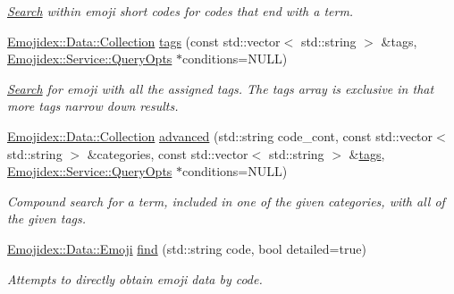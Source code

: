 \begin{DoxyCompactItemize}
\begin{DoxyCompactList}\small\item\em \hyperlink{classEmojidex_1_1Service_1_1Search}{Search} within emoji short codes for codes that end with a term. \end{DoxyCompactList}\item 
\hyperlink{classEmojidex_1_1Data_1_1Collection}{Emojidex\+::\+Data\+::\+Collection} \hyperlink{classEmojidex_1_1Service_1_1Search_af8d1aaece57cd92bf8712493055f2ef6}{tags} (const std\+::vector$<$ std\+::string $>$ \&tags, \hyperlink{classEmojidex_1_1Service_1_1QueryOpts}{Emojidex\+::\+Service\+::\+Query\+Opts} $\ast$conditions=N\+U\+LL)\hypertarget{classEmojidex_1_1Service_1_1Search_af8d1aaece57cd92bf8712493055f2ef6}{}\label{classEmojidex_1_1Service_1_1Search_af8d1aaece57cd92bf8712493055f2ef6}

\begin{DoxyCompactList}\small\item\em \hyperlink{classEmojidex_1_1Service_1_1Search}{Search} for emoji with all the assigned tags. The tags array is exclusive in that more tags narrow down results. \end{DoxyCompactList}\item 
\hyperlink{classEmojidex_1_1Data_1_1Collection}{Emojidex\+::\+Data\+::\+Collection} \hyperlink{classEmojidex_1_1Service_1_1Search_a2924585a8bb92c1b902477cabc154fb0}{advanced} (std\+::string code\+\_\+cont, const std\+::vector$<$ std\+::string $>$ \&categories, const std\+::vector$<$ std\+::string $>$ \&\hyperlink{classEmojidex_1_1Service_1_1Search_af8d1aaece57cd92bf8712493055f2ef6}{tags}, \hyperlink{classEmojidex_1_1Service_1_1QueryOpts}{Emojidex\+::\+Service\+::\+Query\+Opts} $\ast$conditions=N\+U\+LL)\hypertarget{classEmojidex_1_1Service_1_1Search_a2924585a8bb92c1b902477cabc154fb0}{}\label{classEmojidex_1_1Service_1_1Search_a2924585a8bb92c1b902477cabc154fb0}

\begin{DoxyCompactList}\small\item\em Compound search for a term, included in one of the given categories, with all of the given tags. \end{DoxyCompactList}\item 
\hyperlink{classEmojidex_1_1Data_1_1Emoji}{Emojidex\+::\+Data\+::\+Emoji} \hyperlink{classEmojidex_1_1Service_1_1Search_a80970b4a18e5bcc37a2a697de237e8aa}{find} (std\+::string code, bool detailed=true)
\begin{DoxyCompactList}\small\item\em Attempts to directly obtain emoji data by code. \end{DoxyCompactList}\end{DoxyCompactItemize}


